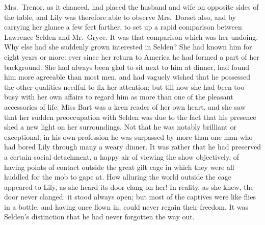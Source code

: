 \documentclass[12pt,a4paper]{book}
\begin{document}
Mrs.\ Trenor, as it chanced, had placed the husband and wife on
opposite sides of the table, and Lily was therefore able to
observe Mrs.\ Dorset also, and by carrying her glance a few feet
farther, to set up a rapid comparison between Lawrence Selden and
Mr.\ Gryce. It was that comparison which was her undoing. Why else
had she suddenly grown interested in Selden? She had known him
for eight years or more: ever since her return to America he had
formed a part of her background. She had always been glad to sit
next to him at dinner, had found him more agreeable than most
men, and had vaguely wished that he possessed the other qualities
needful to fix her attention; but till now she had been too busy
with her own affairs to regard him as more than one of the
pleasant accessories of life. Miss Bart was a keen reader of her
own heart, and she saw that her sudden preoccupation with Selden
was due to the fact that his presence shed a new light on her
surroundings. Not that he was notably brilliant or exceptional;
in his own profession he was surpassed by more than one man who
had bored Lily through many a weary dinner. It was rather that he
had preserved a certain social detachment, a happy air of viewing
the show objectively, of having points of contact outside the
great gilt cage in which they were all huddled for the mob to
gape at. How alluring the world outside the cage appeared
to Lily, as she heard its door clang on her! In reality, as she
knew, the door never clanged: it stood always open; but most of
the captives were like flies in a bottle, and having once flown
in, could never regain their freedom. It was Selden's distinction
that he had never forgotten the way out.
\end{document}
